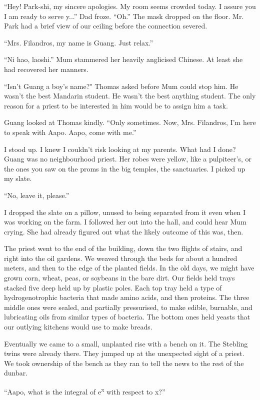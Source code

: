 ``Hey! Park-shi, my sincere apologies. My room seems crowded today. I assure you I am ready to serve y...'' Dad froze. ``Oh.'' The mask dropped on the floor. Mr. Park had a brief view of our ceiling before the connection severed.

``Mrs. Filandros, my name is Guang. Just relax.''

``Ni hao, laoshi.'' Mum stammered her heavily anglicised Chinese. At least she had recovered her manners.

``Isn't Guang a boy's name?" Thomas asked before Mum could stop him. He wasn't the best Mandarin student. He wasn't the best anything student. The only reason for a priest to be interested in him would be to assign him a task.

Guang looked at Thomas kindly. ``Only sometimes. Now, Mrs. Filandros, I'm here to speak with Aapo. Aapo, come with me.''

I stood up. I knew I couldn't risk looking at my parents. What had I done? Guang was no neighbourhood priest. Her robes were yellow, like a pulpiteer's, or the ones you saw on the proms in the big temples, the sanctuaries. I picked up my slate.

``No, leave it, please.''

I dropped the slate on a pillow, unused to being separated from it even when I was working on the farm. I followed her out into the hall, and could hear Mum crying. She had already figured out what the likely outcome of this was, then.

The priest went to the end of the building, down the two flights of stairs, and right into the oil gardens. We weaved through the beds for about a hundred meters, and then to the edge of the planted fields. In the old days, we might have grown corn, wheat, peas, or soybeans in the bare dirt. Our fields held trays stacked five deep held up by plastic poles. Each top tray held a type of hydrogenotrophic bacteria that made amino acids, and then proteins. The three middle ones were sealed, and partially pressurised, to make edible, burnable, and lubricating oils from similar types of bacteria. The bottom ones held yeasts that our outlying kitchens would use to make breads.

Eventually we came to a small, unplanted rise with a bench on it. The Stebling twins were already there. They jumped up at the unexpected sight of a priest. We took ownership of the bench as they ran to tell the news to the rest of the dunbar.

``Aapo, what is the integral of e\textsuperscript{x} with respect to x?''

